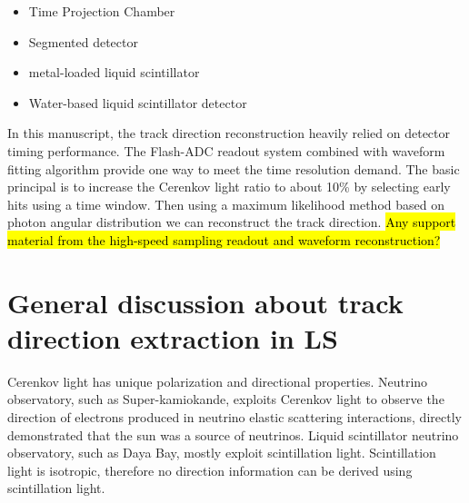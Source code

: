 \documentclass[a4paper,10pt]{cpc-hepnp}
\begin{document}
\begin{itemize}
\item Time Projection Chamber
\item Segmented detector
\item metal-loaded liquid scintillator
\item Water-based liquid scintillator detector
\end{itemize}

In this manuscript, the track direction reconstruction heavily relied on
detector timing performance. The Flash-ADC readout system combined with
waveform fitting algorithm provide one way to meet the time resolution demand.
The basic principal is to increase the Cerenkov light ratio to about 10\% by selecting early
hits using a time window. Then using a maximum
likelihood method based on photon angular distribution we can reconstruct the
track direction.
\hl{Any support material from the high-speed sampling readout and waveform
reconstruction?}

\section{General discussion about track direction extraction in LS}

Cerenkov light has unique polarization and directional properties.
Neutrino observatory, such as Super-kamiokande, exploits Cerenkov
light to observe the direction of electrons produced in neutrino
elastic scattering interactions, directly demonstrated that the
sun was a source of neutrinos.
Liquid scintillator neutrino observatory,
such as Daya Bay, mostly exploit scintillation light.
Scintillation light is isotropic, therefore no direction information can be
derived using scintillation light.
\end{document}
